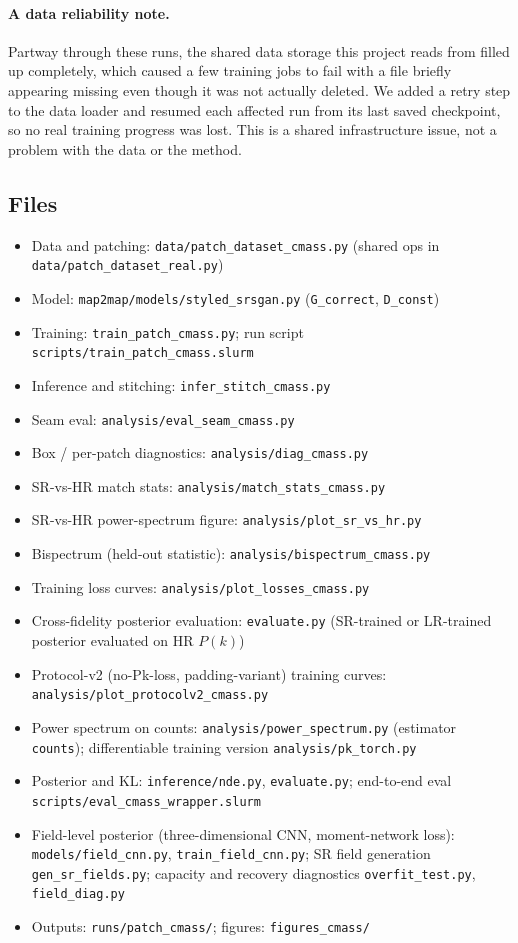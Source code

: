 \paragraph{A data reliability note.} Partway through these runs, the shared
data storage this project reads from filled up completely, which caused a few
training jobs to fail with a file briefly appearing missing even though it was
not actually deleted. We added a retry step to the data loader and resumed
each affected run from its last saved checkpoint, so no real training progress
was lost. This is a shared infrastructure issue, not a problem with the data or
the method.

\subsection{Files}
\begin{itemize}\itemsep0pt
  \item Data and patching: \texttt{data/patch\_dataset\_cmass.py}
  (shared ops in \texttt{data/patch\_dataset\_real.py})
  \item Model: \texttt{map2map/models/styled\_srsgan.py}
  (\texttt{G\_correct}, \texttt{D\_const})
  \item Training: \texttt{train\_patch\_cmass.py};
  run script \texttt{scripts/train\_patch\_cmass.slurm}
  \item Inference and stitching: \texttt{infer\_stitch\_cmass.py}
  \item Seam eval: \texttt{analysis/eval\_seam\_cmass.py}
  \item Box / per-patch diagnostics: \texttt{analysis/diag\_cmass.py}
  \item SR-vs-HR match stats: \texttt{analysis/match\_stats\_cmass.py}
  \item SR-vs-HR power-spectrum figure: \texttt{analysis/plot\_sr\_vs\_hr.py}
  \item Bispectrum (held-out statistic): \texttt{analysis/bispectrum\_cmass.py}
  \item Training loss curves: \texttt{analysis/plot\_losses\_cmass.py}
  \item Cross-fidelity posterior evaluation: \texttt{evaluate.py} (SR-trained
  or LR-trained posterior evaluated on HR $P(k)$)
  \item Protocol-v2 (no-Pk-loss, padding-variant) training curves:
  \texttt{analysis/plot\_protocolv2\_cmass.py}
  \item Power spectrum on counts: \texttt{analysis/power\_spectrum.py}
  (estimator \texttt{counts}); differentiable training version
  \texttt{analysis/pk\_torch.py}
  \item Posterior and KL: \texttt{inference/nde.py}, \texttt{evaluate.py};
  end-to-end eval \texttt{scripts/eval\_cmass\_wrapper.slurm}
  \item Field-level posterior (three-dimensional CNN, moment-network loss):
  \texttt{models/field\_cnn.py}, \texttt{train\_field\_cnn.py};
  SR field generation \texttt{gen\_sr\_fields.py}; capacity and recovery
  diagnostics \texttt{overfit\_test.py}, \texttt{field\_diag.py}
  \item Outputs: \texttt{runs/patch\_cmass/}; figures: \texttt{figures\_cmass/}
\end{itemize}
